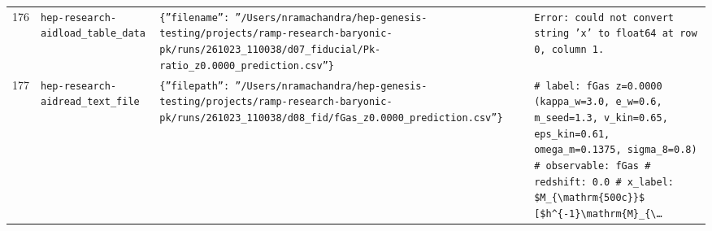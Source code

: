 \documentclass[11pt,a4paper]{article}
\begin{document}
\begin{longtable}{@{}p{}p{}p{}p{}@{}}
176 & \texttt{hep-research-aid}\newline\texttt{load\_\allowbreak{}table\_\allowbreak{}data} & \texttt{\{''filename'':\allowbreak{} ''/\allowbreak{}Users/\allowbreak{}nramachandra/\allowbreak{}hep-genesis-testing/\allowbreak{}projects/\allowbreak{}ramp-research-baryonic-pk/\allowbreak{}runs/\allowbreak{}261023\_\allowbreak{}110038/\allowbreak{}d07\_\allowbreak{}fiducial/\allowbreak{}Pk-ratio\_\allowbreak{}z0.0000\_\allowbreak{}prediction.csv''\}\allowbreak{}} & \texttt{Error:\allowbreak{} could not convert string 'x' to float64 at row 0,\allowbreak{} column 1.} \\
177 & \texttt{hep-research-aid}\newline\texttt{read\_\allowbreak{}text\_\allowbreak{}file} & \texttt{\{''filepath'':\allowbreak{} ''/\allowbreak{}Users/\allowbreak{}nramachandra/\allowbreak{}hep-genesis-testing/\allowbreak{}projects/\allowbreak{}ramp-research-baryonic-pk/\allowbreak{}runs/\allowbreak{}261023\_\allowbreak{}110038/\allowbreak{}d08\_\allowbreak{}fid/\allowbreak{}fGas\_\allowbreak{}z0.0000\_\allowbreak{}prediction.csv''\}\allowbreak{}} & \texttt{\# label:\allowbreak{} fGas z=\allowbreak{}0.0000 (kappa\_\allowbreak{}w=\allowbreak{}3.0,\allowbreak{} e\_\allowbreak{}w=\allowbreak{}0.6,\allowbreak{} m\_\allowbreak{}seed=\allowbreak{}1.3,\allowbreak{} v\_\allowbreak{}kin=\allowbreak{}0.65,\allowbreak{} eps\_\allowbreak{}kin=\allowbreak{}0.61,\allowbreak{} omega\_\allowbreak{}m=\allowbreak{}0.1375,\allowbreak{} sigma\_\allowbreak{}8=\allowbreak{}0.8)\allowbreak{} \# observable:\allowbreak{} fGas \# redshift:\allowbreak{} 0.0 \# x\_\allowbreak{}label:\allowbreak{} \$M\_\allowbreak{}\{\textbackslash{}\allowbreak{}mathrm\{500c\}\allowbreak{}\}\allowbreak{}\$ [\$h\textasciicircum{}\allowbreak{}\{-1\}\allowbreak{}\textbackslash{}\allowbreak{}mathrm\{M\}\allowbreak{}\_\allowbreak{}\{\textbackslash{}\allowbreak{}\ldots{}\allowbreak{}} \\

\end{longtable}
\end{document}
